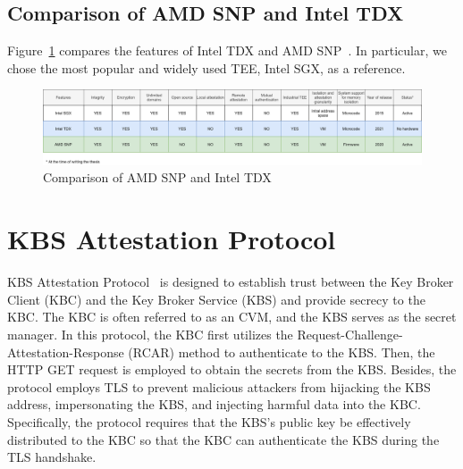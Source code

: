 \subsection{Comparison of AMD SNP and Intel TDX}
Figure~\ref{fig:snp_tdx_compare} compares the features of Intel TDX and AMD SNP~\cite*{amd_sev_summarize}. In particular, we chose the most popular and widely used \acrshort{TEE}, Intel SGX, 
as a reference.

\begin{figure}[htp]
  \centering
  \includegraphics[width=1\textwidth]{images/snp_tdx_compare.png}
  \caption[Comparison of AMD SNP and Intel TDX]{Comparison of AMD SNP and Intel TDX}
  \label{fig:snp_tdx_compare}
\end{figure}




\section{KBS Attestation Protocol}
\label{sec:kbs}

\acrshort{KBS} Attestation Protocol~\cite*{kbs_Attestation_protocol} is designed to establish trust between the Key Broker Client (\acrshort{KBC}) and the Key Broker Service (\acrshort{KBS}) and provide secrecy to the \acrshort{KBC}.  The \acrshort{KBC} is often referred to as an \acrshort{CVM}, and the \acrshort{KBS} serves as the secret manager. In this protocol, the \acrshort{KBC} first utilizes the 
Request-Challenge-Attestation-Response (RCAR) method to authenticate to the \acrshort{KBS}. Then, the HTTP GET request is employed to obtain the secrets from the \acrshort{KBS}. Besides, the protocol employs TLS\cite*{tls_record_size} to prevent malicious attackers from hijacking the \acrshort{KBS} address,  impersonating the \acrshort{KBS},  and injecting harmful 
data into the \acrshort{KBC}. Specifically, the protocol requires that the \acrshort{KBS}'s public key be effectively distributed to the \acrshort{KBC} so that the \acrshort{KBC} can authenticate the \acrshort{KBS} during the TLS handshake.

